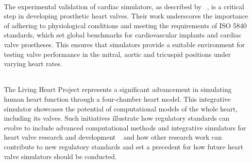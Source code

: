 \\
The experimental validation of cardiac simulators, as described by ~, is a critical step in developing prosthetic heart valves. Their work underscores the importance of adhering to physiological conditions and meeting the requirements of ISO 5840 standards, which set global benchmarks for cardiovascular implants and cardiac valve prostheses. This ensures that simulators provide a suitable environment for testing valve performance in the mitral, aortic and tricuspid positions under varying heart rates.


\\
The Living Heart Project represents a significant advancement in simulating human heart function through a four-chamber heart model. This integrative simulator showcases the potential of computational models of the whole heart, including its valves. Such initiatives illustrate how regulatory standards can evolve to include advanced computational methods and integrative simulators for heart valve research and development ~ and how other research work can contribute to new regulatory standards and set a precedent for how future heart valve simulators should be conducted.

